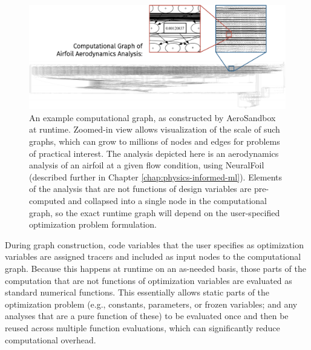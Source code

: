 \begin{figure}[h]
    \centering
    \includegraphics[width=\textwidth]{../figures/large_computational_graph-crop.pdf}
    \caption{An example computational graph, as constructed by AeroSandbox at runtime. Zoomed-in view allows visualization of the scale of such graphs, which can grow to millions of nodes and edges for problems of practical interest. The analysis depicted here is an aerodynamics analysis of an airfoil at a given flow condition, using NeuralFoil (described further in Chapter \ref{chap:physics-informed-ml}). Elements of the analysis that are not functions of design variables are pre-computed and collapsed into a single node in the computational graph, so the exact runtime graph will depend on the user-specified optimization problem formulation.}
    \label{fig:computational-graph-aerosandbox}
\end{figure}

During graph construction, code variables that the user specifies as optimization variables are assigned tracers and included as input nodes to the computational graph. Because this happens at runtime on an as-needed basis, those parts of the computation that are not functions of optimization variables are evaluated as standard numerical functions. This essentially allows static parts of the optimization problem (e.g., constants, parameters, or frozen variables; and any analyses that are a pure function of these) to be evaluated once and then be reused across multiple function evaluations, which can significantly reduce computational overhead.

